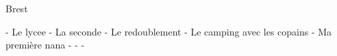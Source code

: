 Brest 

- Le lycee 
- La seconde
- Le redoublement 
- Le camping avec les copains
- Ma première nana
-  
-  
- 
